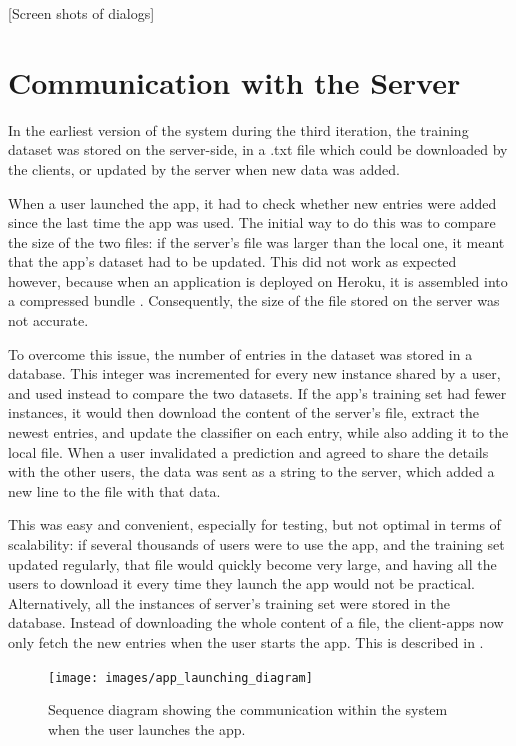 \documentclass{mproj}
\begin{document}
[Screen shots of dialogs]

\section{Communication with the Server}

In the earliest version of the system during the third iteration, the training dataset was stored on the server-side, in a .txt file which could be downloaded by the clients, or updated by the server when new data was added. \par

When a user launched the app, it had to check whether new entries were added since the last time the app was used. The initial way to do this was to compare the size of the two files: if the server's file was larger than the local one, it meant that the app's dataset had to be updated. This did not work as expected however, because when an application is deployed on Heroku, it is assembled into a compressed bundle \cite{herokuslug}. Consequently, the size of the file stored on the server was not accurate. \par 

To overcome this issue, the number of entries in the dataset was stored in a database. This integer was incremented for every new instance shared by a user, and used instead to compare the two datasets. If the app's training set had fewer instances, it would then download the content of the server's file, extract the newest entries, and update the classifier on each entry, while also adding it to the local file. When a user invalidated a prediction and agreed to share the details with the other users, the data was sent as a string to the server, which added a new line to the file with that data.\par

This was easy and convenient, especially for testing, but not optimal in terms of scalability: if several thousands of users were to use the app, and the training set updated regularly, that file would quickly become very large, and having all the users to download it every time they launch the app would not be practical. Alternatively, all the instances of server's training set were stored in the database. Instead of downloading the whole content of a file, the client-apps now only fetch the new entries when the user starts the app. This is described in .
\begin{figure}[h]
	\centering
	\texttt{[image: images/app\_launching\_diagram]}
	\caption{Sequence diagram showing the communication within the system when the user launches the app.}
	\label{fig:launch}
\end{figure}
\end{document}
